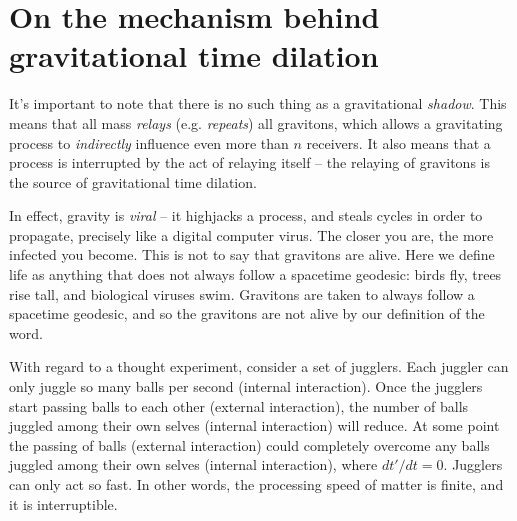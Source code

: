 \documentclass[12pt]{article}
\begin{document}











\section{On the mechanism behind gravitational time dilation}
It's important to note that there is no such thing as a gravitational {\textit{shadow}}.
This means that all mass {\textit{relays}} (e.g. {\textit{repeats}}) all gravitons, which allows a gravitating process to {\textit{indirectly}} influence even more than $n$ receivers.
It also means that a process is interrupted by the act of relaying itself -- the relaying of gravitons is the source of gravitational time dilation.

In effect, gravity is {\textit{viral}} -- it highjacks a process, and steals cycles in order to propagate, precisely like a digital computer virus.
The closer you are, the more infected you become.
This is not to say that gravitons are alive.
Here we define life as anything that does not always follow a spacetime geodesic: birds fly, trees rise tall, and biological viruses swim.
Gravitons are taken to always follow a spacetime geodesic, and so the gravitons are not alive by our definition of the word.

With regard to a thought experiment, consider a set of jugglers.
Each juggler can only juggle so many balls per second (internal interaction).
Once the jugglers start passing balls to each other (external interaction), the number of balls juggled among their own selves (internal interaction) will reduce.
At some point the passing of balls (external interaction) could completely overcome any balls juggled among their own selves (internal interaction), where $dt'/dt = 0$.
Jugglers can only act so fast. 
In other words, the processing speed of matter is finite, and it is interruptible.
\end{document}
